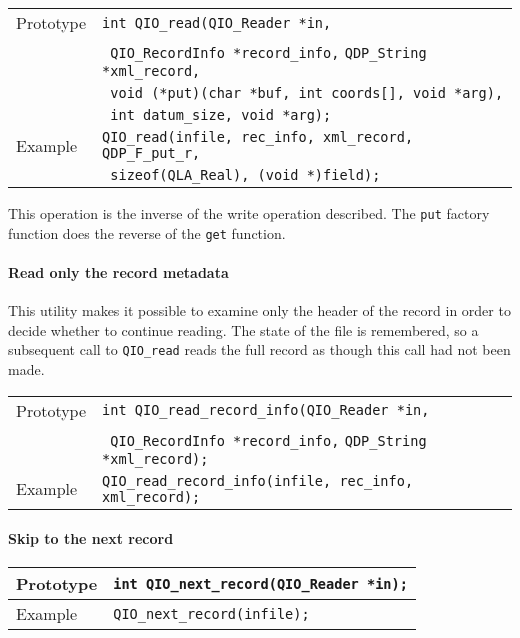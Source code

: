 \documentclass{article}
\newcommand{\QMDhandle}{{\tt QDP\_String }}
\begin{document}
\begin{flushleft}
  \begin{tabular}{|l|l|}
  \hline
  Prototype      & \verb|int QIO_read(QIO_Reader *in,| \\
            & \verb| QIO_RecordInfo *record_info,| \QMDhandle \verb|*xml_record, |\\
	    & \verb| void (*put)(char *buf, int coords[], void *arg), |\\
            & \verb| int datum_size, void *arg);| \\
\hline
  Example  & \verb|QIO_read(infile, rec_info, xml_record, QDP_F_put_r, |\\
           & \verb| sizeof(QLA_Real), (void *)field);|\\
   \hline
 \end{tabular}
\end{flushleft}
%
This operation is the inverse of the write operation described.  The
\verb|put| factory function does the reverse of the \verb|get| function.

\paragraph{Read only the record metadata}

This utility makes it possible to examine only the header of the
record in order to decide whether to continue reading.  The state of
the file is remembered, so a subsequent call to \verb|QIO_read| reads
the full record as though this call had not been made.
%
\begin{flushleft}
  \begin{tabular}{|l|l|}
  \hline
  Prototype      & \verb|int QIO_read_record_info(QIO_Reader *in,| \\
                 & \verb| QIO_RecordInfo *record_info,| \QMDhandle \verb|*xml_record);| \\
\hline
  Example  & \verb|QIO_read_record_info(infile, rec_info, xml_record);|\\
   \hline
 \end{tabular}
\end{flushleft}
%

\paragraph{Skip to the next record}

\begin{flushleft}
  \begin{tabular}{|l|l|}
  \hline
  Prototype      & \verb|int QIO_next_record(QIO_Reader *in);| \\
\hline
  Example  & \verb|QIO_next_record(infile);|\\
   \hline
 \end{tabular}
\end{flushleft}
%
\end{document}
